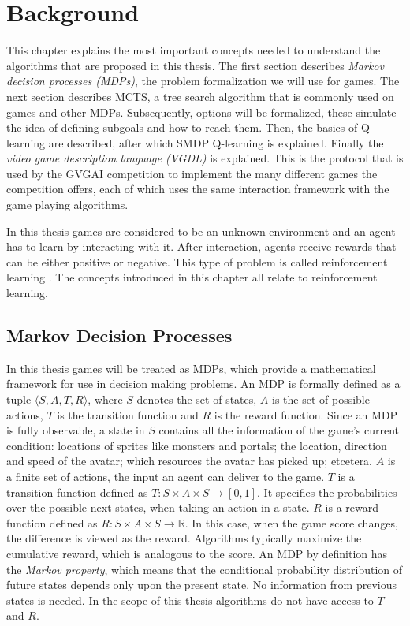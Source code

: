\chapter{Background}
\label{sec:background}

This chapter explains the most important concepts needed to understand the
algorithms that are proposed in this thesis. The first section describes
\emph{Markov decision processes (MDPs)}, the problem formalization we will use
for games. The next section describes MCTS, a tree search algorithm that is
commonly used on games and other MDPs. Subsequently, options will be formalized,
these simulate the idea of defining subgoals and how to reach them. Then, the
basics of Q-learning are described, after which SMDP Q-learning is explained.
Finally the \emph{video game description language (VGDL)} is explained. This is
the protocol that is used by the GVGAI competition to implement the many
different games the competition offers, each of which uses the same interaction
framework with the game playing algorithms.

In this thesis games are considered to be an unknown environment and an agent
has to learn by interacting with it. After interaction, agents receive
rewards that can be either positive or negative. This type of problem is called
reinforcement learning \cite{wiering2012reinforcement}. The concepts introduced
in this chapter all relate to reinforcement learning.

\section{Markov Decision Processes}
\label{subsec:mdps}
In this thesis games will be treated as MDPs, which provide a mathematical
framework for use in decision making problems. An MDP is formally defined as a
tuple $\langle S, A, T, R \rangle$, where $S$ denotes the set of states, $A$ is
the set of possible actions, $T$ is the transition function and $R$ is the
reward function. Since an MDP is fully observable, a state in $S$ contains all
the information of the game's current condition: locations of sprites like
monsters and portals; the location, direction and speed of the avatar; which
resources the avatar has picked up; etcetera. $A$ is a finite set of actions,
the input an agent can deliver to the game. $T$ is a transition function defined
as $T : S \times A \times S \rightarrow \left[0,1\right]$. It specifies the
probabilities over the possible next states, when taking an action in a state.
$R$ is a reward function defined as $R: S \times A \times S \rightarrow
\mathbb{R}$. In this case, when the game score changes, the difference is viewed
as the reward.  Algorithms typically maximize the cumulative reward, which is
analogous to the score. An MDP by definition has the \emph{Markov property},
which means that the conditional probability distribution of future states
depends only upon the present state. No information from previous states is
needed. In the scope of this thesis algorithms do not have access to $T$ and
$R$.

